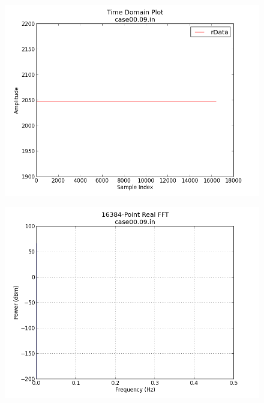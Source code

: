 \documentclass{article}
\begin{document}
\begin{figure}[ht]
	\centering
	\begin{minipage}{.5\textwidth}
		\centering\includegraphics[width=1.0\linewidth]{input}
		\label{fig:input_tdomain}
	\end{minipage}%
	\begin{minipage}{.5\textwidth}
		\centering\includegraphics[width=1.0\linewidth]{input_fft}
		\label{fig:input_fdomain}
	\end{minipage}
\end{figure}
\end{document}

